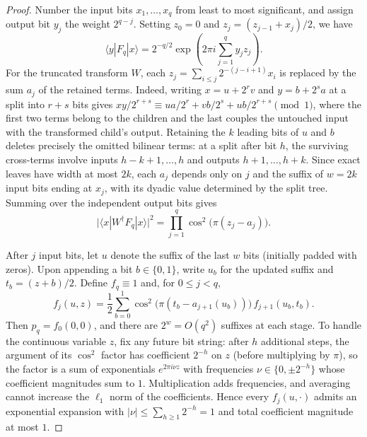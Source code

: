 \documentclass[11pt]{article}
\begin{document}
\begin{proof}
Number the input bits $x_1, \dots, x_q$ from least to most significant, and assign output bit $y_j$ the weight $2^{q-j}$. Setting $z_0 = 0$ and $z_j = (z_{j-1} + x_j)/2$, we have
\[
\langle y|F_q|x\rangle = 2^{-q/2}\exp\!\left(2\pi i \sum_{j=1}^q y_j z_j\right).
\]
For the truncated transform $W$, each $z_j = \sum_{i \le j} 2^{-(j-i+1)} x_i$ is replaced by the sum $a_j$ of the retained terms. Indeed, writing $x = u + 2^r v$ and $y = b + 2^s a$ at a split into $r + s$ bits gives $xy/2^{r+s} \equiv ua/2^r + vb/2^s + ub/2^{r+s} \pmod 1$, where the first two terms belong to the children and the last couples the untouched input with the transformed child's output. Retaining the $k$ leading bits of $u$ and $b$ deletes precisely the omitted bilinear terms: at a split after bit $h$, the surviving cross-terms involve inputs $h-k+1, \dots, h$ and outputs $h+1, \dots, h+k$. Since exact leaves have width at most $2k$, each $a_j$ depends only on $j$ and the suffix of $w = 2k$ input bits ending at $x_j$, with its dyadic value determined by the split tree. Summing over the independent output bits gives
\begin{equation}\label{eq:overlap-product}
\bigl|\langle x|W^\dagger F_q|x\rangle\bigr|^2 = \prod_{j=1}^q \cos^2\!\bigl(\pi(z_j - a_j)\bigr).
\end{equation}

After $j$ input bits, let $u$ denote the suffix of the last $w$ bits (initially padded with zeros). Upon appending a bit $b \in \{0, 1\}$, write $u_b$ for the updated suffix and $t_b = (z + b)/2$. Define $f_q \equiv 1$ and, for $0 \le j < q$,
\[
f_j(u, z) = \frac{1}{2}\sum_{b=0}^1 \cos^2\!\bigl(\pi(t_b - a_{j+1}(u_b))\bigr)\, f_{j+1}(u_b, t_b).
\]
Then $p_q = f_0(0, 0)$, and there are $2^w = O(q^2)$ suffixes at each stage. To handle the continuous variable $z$, fix any future bit string: after $h$ additional steps, the argument of its $\cos^2$ factor has coefficient $2^{-h}$ on $z$ (before multiplying by $\pi$), so the factor is a sum of exponentials $e^{2\pi i \nu z}$ with frequencies $\nu \in \{0, \pm 2^{-h}\}$ whose coefficient magnitudes sum to $1$. Multiplication adds frequencies, and averaging cannot increase the $\ell_1$ norm of the coefficients. Hence every $f_j(u, \cdot)$ admits an exponential expansion with $|\nu| \le \sum_{h \ge 1} 2^{-h} = 1$ and total coefficient magnitude at most $1$.


\end{proof}
\end{document}
